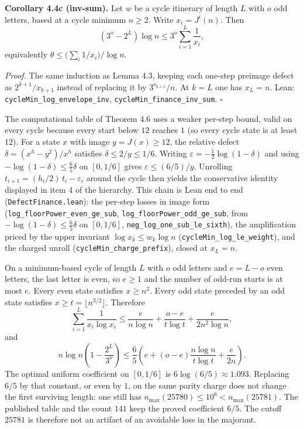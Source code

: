 \documentclass[12pt]{article}
\begin{document}
\textbf{Corollary 4.4c (inv-sum).} Let \(w\) be a cycle itinerary of
length \(L\) with \(o\) odd letters, based at a cycle minimum
\(n\ge 2\). Write \(x_i=J^i(n)\). Then \[
(3^o-2^L)\log n\le 3^o\sum_{i=1}^{L}\frac1{x_i},
\] equivalently \(\theta\le\bigl(\sum_i 1/x_i\bigr)/\log n\).

\emph{Proof.} The same induction as Lemma 4.3, keeping each one-step
preimage defect as \(2^{k+1}/x_{k+1}\) instead of replacing it by
\(3^{o_{k+1}}/n\). At \(k=L\) one has \(x_L=n\). Lean:
\texttt{\nolinkurl{cycleMin_log_envelope_inv}},
\texttt{\nolinkurl{cycleMin_finance_inv_sum}}. \(\square\)

The computational table of Theorem 4.6 uses a weaker per-step bound,
valid on every cycle because every start below \(12\) reaches \(1\) (so
every cycle state is at least \(12\)). For a state \(x\) with image
\(y=J(x)\ge 12\), the relative defect \(\delta=(x^h-y^2)/x^h\) satisfies
\(\delta\le 2/y\le 1/6\). Writing
\(\varepsilon=-\tfrac12\log(1-\delta)\) and using
\(-\log(1-\delta)\le\tfrac65\delta\) on \([0,1/6]\) gives
\(\varepsilon\le(6/5)/y\). Unrolling
\(t_{i+1}=(h_i/2)\,t_i-\varepsilon_i\) around the cycle then yields the
conservative identity displayed in item 4 of the hierarchy. This chain
is Lean end to end (\texttt{\nolinkurl{DefectFinance.lean}}): the
per-step losses in image form
(\texttt{\nolinkurl{log_floorPower_even_ge_sub}},
\texttt{\nolinkurl{log_floorPower_odd_ge_sub}}, from
\(-\log(1-\delta)\le\tfrac65\delta\) on \([0,1/6]\),
\texttt{\nolinkurl{neg_log_one_sub_le_sixth}}), the amplification priced
by the upper invariant \(\log x_k\le w_k\log n\)
(\texttt{\nolinkurl{cycleMin_log_le_weight}}), and the charged unroll
(\texttt{\nolinkurl{cycleMin_charge_prefix}}), closed at \(x_L=n\).

On a minimum-based cycle of length \(L\) with \(o\) odd letters and
\(e=L-o\) even letters, the last letter is even, so \(e\ge 1\) and the
number of odd-run starts is at most \(e\). Every even state satisfies
\(x\ge n^2\). Every odd state preceded by an odd state satisfies
\(x\ge t=\lfloor n^{3/2}\rfloor\). Therefore \[
\sum_{i=1}^{L}\frac{1}{x_i\log x_i}
\le
\frac{e}{n\log n}
+\frac{o-e}{t\log t}
+\frac{e}{2n^2\log n},
\] and \[
n\log n\left(1-\frac{2^L}{3^o}\right)
\le
\frac65\left(
e+(o-e)\frac{n\log n}{t\log t}+\frac{e}{2n}
\right).
\] The optimal uniform coefficient on \([0,1/6]\) is
\(6\log(6/5)\approx 1.093\). Replacing \(6/5\) by that constant, or even
by \(1\), on the same parity charge does not change the first surviving
length: one still has \(n_{\max}(25780)\le 10^6<n_{\max}(25781)\). The
published table and the count \(141\) keep the proved coefficient
\(6/5\). The cutoff \(25781\) is therefore not an artifact of an
avoidable loss in the majorant.
\end{document}
